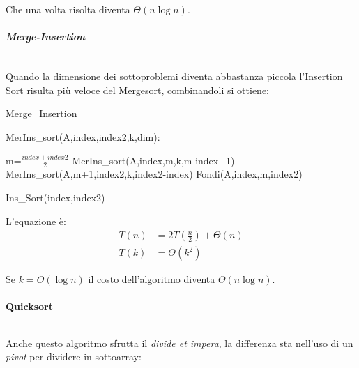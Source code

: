 \documentclass{article}
\begin{document}
\noindent Che una volta risolta diventa $\Theta(n\log n)$.

\subparagraph{Merge-Insertion} $\ $\newline

\noindent Quando la dimensione dei sottoproblemi diventa abbastanza piccola l'Insertion Sort risulta più veloce del Mergesort, combinandoli si ottiene:

\begin{algorithm}[ht]
\caption{Merge\_Insertion}
\begin{algorithmic}
\State MerIns\_sort(A,index,index2,k,dim):


        \State m=$\frac{index+index2}{2}$
        \State MerIns\_sort(A,index,m,k,m-index+1)
        \State MerIns\_sort(A,m+1,index2,k,index2-index)
        \State Fondi(A,index,m,index2)

    \Else

        \State Ins\_Sort(index,index2)

    \EndIf
\end{algorithmic}
\end{algorithm}

\noindent L'equazione è:
\begin{equation}
    \nonumber
    \begin{split}
        T(n)&=2T(\frac{n}{2})+\Theta(n)\\
        T(k)&=\Theta(k^2)
    \end{split}
\end{equation}\newline

\noindent Se $k=O(\log n)$ il costo dell'algoritmo diventa $\Theta(n\log n)$.

\newpage

\paragraph{Quicksort} $\ $\newline

\noindent Anche questo algoritmo sfrutta il \textit{divide et impera}, la differenza sta nell'uso di un \textit{pivot} per dividere in sottoarray:
\end{document}
